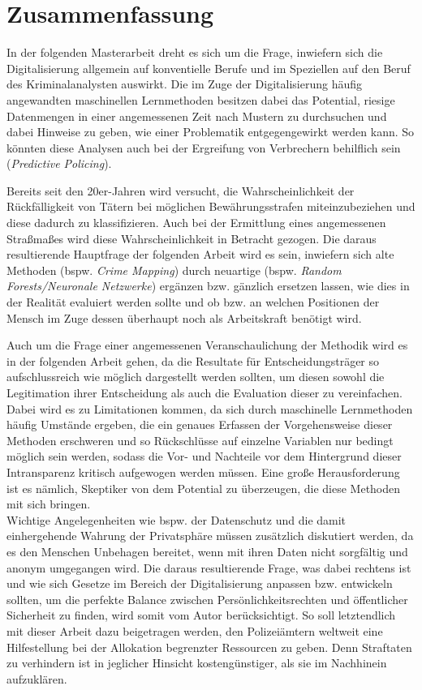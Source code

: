\documentclass[a4paper,12pt,parskip,bibtotoc,liststotoc]{article}
\begin{document}
\tableofcontents

\newpage
\section*{Zusammenfassung}

In der folgenden Masterarbeit dreht es sich um die Frage, inwiefern sich die Digitalisierung allgemein auf konventielle Berufe und im Speziellen auf den Beruf des Kriminalanalysten auswirkt. Die im Zuge der Digitalisierung häufig angewandten maschinellen Lernmethoden besitzen dabei das Potential, riesige Datenmengen in einer angemessenen Zeit nach Mustern zu durchsuchen und dabei Hinweise zu geben, wie einer Problematik entgegengewirkt werden kann. 
So könnten diese Analysen auch bei der Ergreifung von Verbrechern behilflich sein (\textit{Predictive Policing}).

Bereits seit den 20er-Jahren wird versucht, die Wahrscheinlichkeit der Rückfälligkeit von Tätern bei möglichen Bewährungsstrafen miteinzubeziehen und diese dadurch zu klassifizieren.
Auch bei der Ermittlung eines angemessenen Straßmaßes wird diese Wahrscheinlichkeit in Betracht gezogen.
Die daraus resultierende Hauptfrage der folgenden Arbeit wird es sein, inwiefern sich alte Methoden (bspw. \textit{Crime Mapping}) durch neuartige (bspw. \textit{Random Forests/Neuronale Netzwerke}) ergänzen bzw. gänzlich ersetzen lassen, wie dies in der Realität evaluiert werden sollte und ob bzw. an welchen Positionen der Mensch im Zuge dessen überhaupt noch als Arbeitskraft benötigt wird.

Auch um die Frage einer angemessenen Veranschaulichung der Methodik wird es in der folgenden Arbeit gehen, da die Resultate für Entscheidungsträger so aufschlussreich wie möglich dargestellt werden sollten, um diesen sowohl die Legitimation ihrer Entscheidung als auch die Evaluation dieser zu vereinfachen.
Dabei wird es zu Limitationen kommen, da sich durch maschinelle Lernmethoden häufig Umstände ergeben, die ein genaues Erfassen der Vorgehensweise dieser Methoden erschweren und so Rückschlüsse auf einzelne Variablen nur bedingt möglich sein werden, sodass die Vor- und Nachteile vor dem Hintergrund dieser Intransparenz kritisch aufgewogen werden müssen.
Eine große Herausforderung ist es nämlich, Skeptiker von dem Potential zu überzeugen, die diese Methoden mit sich bringen.\\

Wichtige Angelegenheiten wie bspw. der Datenschutz und die damit einhergehende Wahrung der Privatsphäre müssen zusätzlich diskutiert werden, da es den Menschen Unbehagen bereitet, wenn mit ihren Daten nicht sorgfältig und anonym umgegangen wird. 
Die daraus resultierende Frage, was dabei rechtens ist und wie sich Gesetze im Bereich der Digitalisierung anpassen bzw. entwickeln sollten, um die perfekte Balance zwischen Persönlichkeitsrechten und öffentlicher Sicherheit zu finden, wird somit vom Autor berücksichtigt.
So soll letztendlich mit dieser Arbeit dazu beigetragen werden, den Polizeiämtern weltweit eine Hilfestellung bei der Allokation begrenzter Ressourcen zu geben. 
Denn Straftaten zu verhindern ist in jeglicher Hinsicht kostengünstiger, als sie im Nachhinein aufzuklären.
\end{document}
